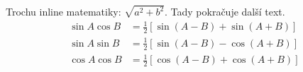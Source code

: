 \documentclass[12pt]{article}
\begin{document}
   Trochu inline matematiky: $\sqrt{a^2 + b^2}$. Tady pokračuje další text.
          \begin{align*}
          \sin A \cos B &= \frac{1}{2}\left[ \sin(A-B)+\sin(A+B) \right] \\
          \sin A \sin B &= \frac{1}{2}\left[ \sin(A-B)-\cos(A+B) \right] \\
          \cos A \cos B &= \frac{1}{2}\left[ \cos(A-B)+\cos(A+B) \right] \\
          \end{align*}
       
\end{document}
